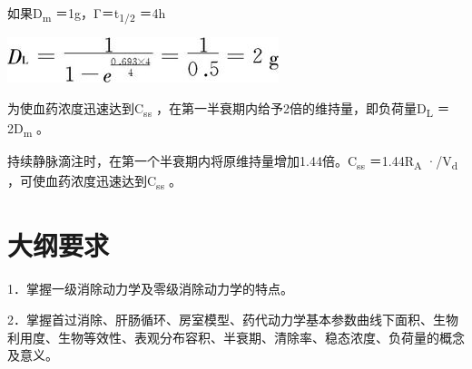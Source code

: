 如果D\textsubscript{m} ＝1g，Γ＝t\textsubscript{1/2} ＝4h

\includegraphics{./images/Image00080.jpg}

为使血药浓度迅速达到C\textsubscript{ss}
，在第一半衰期内给予2倍的维持量，即负荷量D\textsubscript{L}
＝2D\textsubscript{m} 。

持续静脉滴注时，在第一个半衰期内将原维持量增加1.44倍。C\textsubscript{ss}
＝1.44R\textsubscript{A} ·/V\textsubscript{d}
，可使血药浓度迅速达到C\textsubscript{ss} 。

\section*{大纲要求}

1．掌握一级消除动力学及零级消除动力学的特点。

2．掌握首过消除、肝肠循环、房室模型、药代动力学基本参数曲线下面积、生物利用度、生物等效性、表观分布容积、半衰期、清除率、稳态浓度、负荷量的概念及意义。

